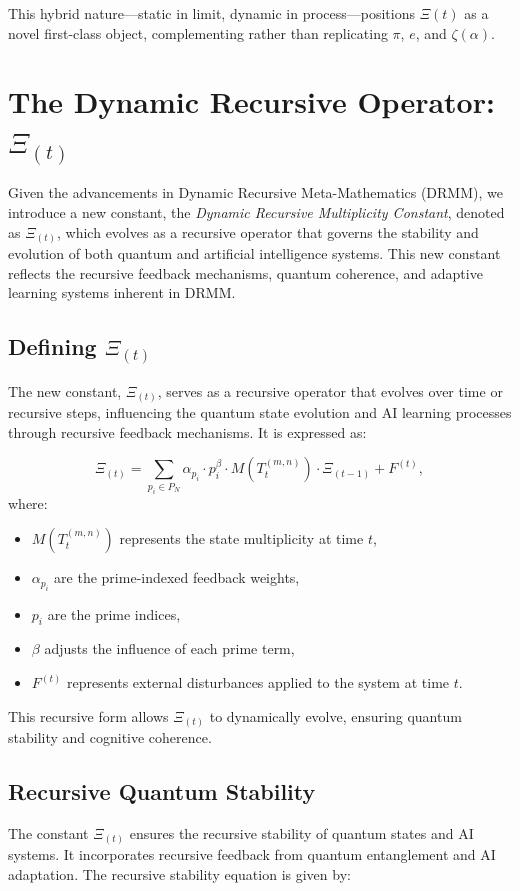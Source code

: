 \documentclass{article}
\theoremstyle{plain}
\begin{document}
This hybrid nature—static in limit, dynamic in process—positions \(\Xi(t) \) as a novel first-class object, complementing rather than replicating \( \pi \), \( e \), and \( \zeta(\alpha) \).



\section{The Dynamic Recursive Operator: $\Xi_(t)$}

Given the advancements in Dynamic Recursive Meta-Mathematics (DRMM), we introduce a new constant, the \textit{Dynamic Recursive Multiplicity Constant}, denoted as $\Xi_(t)$, which evolves as a recursive operator that governs the stability and evolution of both quantum and artificial intelligence systems. This new constant reflects the recursive feedback mechanisms, quantum coherence, and adaptive learning systems inherent in DRMM.

\subsection{Defining $\Xi_(t)$}
The new constant, $\Xi_(t)$, serves as a recursive operator that evolves over time or recursive steps, influencing the quantum state evolution and AI learning processes through recursive feedback mechanisms. It is expressed as:

\[
\Xi_(t) = \sum_{p_i \in P_N} \alpha_{p_i} \cdot p_i^{\beta} \cdot M(T_t^{(m, n)}) \cdot \Xi_(t-1) + F^{(t)},
\]
where:
\begin{itemize}
    \item $M(T_t^{(m, n)})$ represents the state multiplicity at time $t$,
    \item $\alpha_{p_i}$ are the prime-indexed feedback weights,
    \item $p_i$ are the prime indices,
    \item $\beta$ adjusts the influence of each prime term,
    \item $F^{(t)}$ represents external disturbances applied to the system at time $t$.
\end{itemize}

This recursive form allows $\Xi_(t)$ to dynamically evolve, ensuring quantum stability and cognitive coherence.

\subsection{Recursive Quantum Stability}
The constant $\Xi_(t)$ ensures the recursive stability of quantum states and AI systems. It incorporates recursive feedback from quantum entanglement and AI adaptation. The recursive stability equation is given by:
\end{document}
